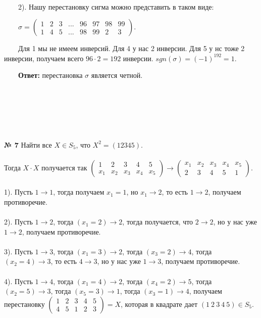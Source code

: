 \documentclass[a4paper, 12pt]{article}
\begin{document}
    \\\par \ \ \ \ 2). Нашу перестановку сигма можно представить в таком виде: 
    \\\par \ \ \ \ $\sigma = \begin{pmatrix}1 & 2 & 3  & ... & 96 & 97 & 98 & 99\\1 & 4 & 5  & ... & 98 & 99 & 2 & 3 \end{pmatrix}$.
    \\\par \ \ \ \ Для 1 мы не имеем инверсий. Для 4 у нас 2 инверсии. Для 5 у нс тоже 2 инверсии, получаем всего $96 \cdot 2 = 192$ инверсии. $sgn(\sigma) = (-1)^{192} = 1$.
    \par \ \ \ \ \textbf{Ответ: } перестановка $\sigma$ является четной.
    \\\\\\\\\\\\
    \\ \textbf{№ 7} Найти все $X \in S_5$, что $X^2 = (1 2 3 4 5)$.
    \\
    \\ Тогда $X \cdot X $ получается так $\begin{pmatrix}1 & 2 & 3 & 4 & 5\\x_1 & x_2 & x_3 & x_4 & x_5\end{pmatrix} \to \begin{pmatrix}x_1 & x_2 & x_3 & x_4 & x_5\\2 & 3 & 4 & 5 & 1\end{pmatrix}$.
    \\
    \\ 1). Пусть $1 \to 1$, тогда получаем $x_1 = 1$, но $x_1 \to 2$, то есть $1 \to 2$, получаем противоречие.
    \\
    \\ 2). Пусть $1 \to 2$, тогда $(x_1 = 2) \to 2$, тогда получается, что $2 \to 2$, но у нас уже $1 \to 2$, получаем противоречие.
    \\
    \\ 3). Пусть $1 \to 3$, тогда $(x_1 = 3) \to 2$, тогда $(x_3 = 2) \to 4$, тогда $(x_2 = 4) \to 3$, то есть $4 \to 3$, но у нас уже $1 \to 3$, получаем противоречие.
    \\
    \\ 4). Пусть $1 \to 4$, тогда $(x_1 = 4) \to 2$, тогда $(x_4 = 2) \to 5$, тогда $(x_2 = 5) \to 3$, тогда $(x_5 = 3) \to 1$, тогда $(x_3 = 1) \to 4$, получаем перестановку $\begin{pmatrix}1 & 2 & 3 & 4 & 5\\4 & 5 & 1 & 2 & 3\end{pmatrix} = X$, которая в квадрате дает $(1 \ 2\ 3\ 4\ 5) \in S_5$.
\end{document}

